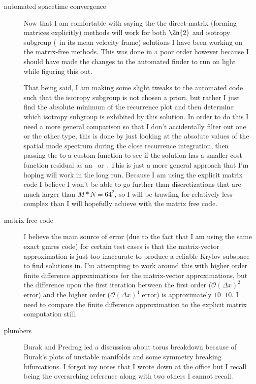 \begin{description}
{\begin{description}
\item[automated spacetime convergence]
Now that I am comfortable with saying the the direct-matrix (forming matrices explicitly)
methods will work for both $\Zn{2}$ and  isotropy subgroup (\rpo\ in its mean velocity frame)
solutions I have been working on the matrix-free methods. This was done in a poor order
however because I should have made the changes to the automated {\twot}
finder to run on light while figuring this out.

That being said, I am making some slight tweaks to the automated code such that
the isotropy subgroup is not chosen a priori, but rather I just find the
absolute minimum of the recurrence plot and then determine which isotropy
subgroup is exhibited by this solution. In order to do this I need a more
general comparison so that I don't accidentally filter out one or the other
type, this is done by just looking at the absolute values of the spatial mode
spectrum during the close recurrence integration, then passing the
{\twot} to a custom function to see if the solution has a
smaller cost function residual as an \rpo\ or \ppo. This is just a more general
approach that I'm hoping will work in the long run. Because I am using the
explicit matrix code I believe I won't be able to go further than
discretizations that are much larger than $M*N = 64^2$, so I will be trawling
for relatively less complex {\twots} than I will hopefully
achieve with the matrix free code.

\item[matrix free code]
I believe the main source of error (due to the fact that I am using the same exact gmres code)
for certain test cases is that the matrix-vector approximation is just too inaccurate to
produce a reliable Krylov subspace to find solutions in. I'm attempting to work around this with
higher order finite difference approximations for the matrix-vector approximations, but the difference
upon the first iteration between the first order ($\mathcal{O}(\Delta x)^2$ error) and the higher
order ($\mathcal{O}(\Delta x)^4$ error) is approximately $10^-10$. I need to compare the finite difference
approximation to the explicit matrix computation still.

\item[plumbers]
Burak and Predrag led a discussion about torus breakdown because of Burak's plots of unstable manifolds
and some symmetry breaking bifurcations. I forgot my notes that I wrote down at the office but I recall
 being the overarching reference along with two others I cannot recall.


\end{description}}
\end{description}

